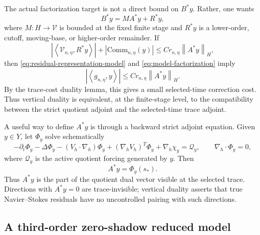 \documentclass[11pt]{article}
\numberwithin{equation}{section}
\newcommand{\divh}{\nabla_h\cdot}
\newcommand{\norm}[2]{\left\|#1\right\|_{#2}}
\newcommand{\ip}[2]{\left\langle #1,#2\right\rangle}
\newcommand{\calQ}{\mathcal Q}
\newcommand{\calV}{\mathcal V}
\begin{document}
The actual factorization target is not a direct bound on \(B^*y\).  Rather, one wants
\begin{equation}\label{eq:model-factorization}
B^*y=M A^*y+R^*y,
\end{equation}
where \(M:H\to\calV\) is bounded at the fixed finite stage and \(R^*y\) is a lower-order, cutoff, moving-base, or higher-order remainder.  If
\begin{equation}\label{eq:remainder-factor-bound}
\left|\ip{\calV_{n,\eta}}{R^*y}\right|
+|\mathrm{Comm}_{n,\eta}(y)|
\le C r_{n,\eta}\norm{A^*y}{H},
\end{equation}
then \eqref{eq:residual-representation-model} and \eqref{eq:model-factorization} imply
\[
|\ip{g_{n,\eta}}{y}|
\le C r_{n,\eta}\norm{A^*y}{H}.
\]
By the trace-cost duality lemma, this gives a small selected-time correction cost.  Thus vertical duality is equivalent, at the finite-stage level, to the compatibility between the strict quotient adjoint and the selected-time trace adjoint.

A useful way to define \(A^*y\) is through a backward strict adjoint equation.  Given \(y\in Y\), let \(\Phi_y\) solve schematically
\begin{equation}\label{eq:backward-strict-adjoint}
-\partial_t\Phi_y-\Delta\Phi_y
-(V_h\cdot\nabla_h)\Phi_y
+(\nabla_hV_h)^T\Phi_y+\nabla_h\chi_y
=
\calQ_y,
\qquad
\divh\Phi_y=0,
\end{equation}
where \(\calQ_y\) is the active quotient forcing generated by \(y\).  Then
\begin{equation}\label{eq:Astar-adjoint-trace}
A^*y=\Phi_y(s_*).
\end{equation}
Thus \(A^*y\) is the part of the quotient dual vector visible at the selected trace.  Directions with \(A^*y=0\) are trace-invisible; vertical duality asserts that true Navier--Stokes residuals have no uncontrolled pairing with such directions.

\subsection{A third-order zero-shadow reduced model}\label{subsec:third-order-reduced-test}
\end{document}
